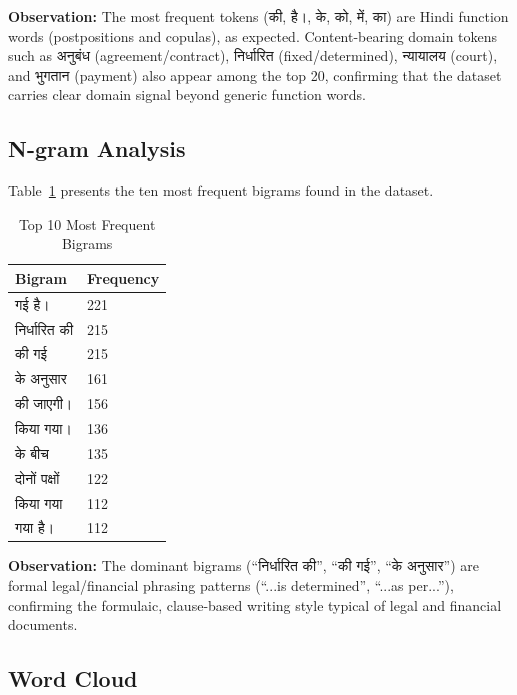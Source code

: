 \textbf{Observation:} The most frequent tokens (की, है।, के, को, में, का) are Hindi function words (postpositions and copulas), as expected. Content-bearing domain tokens such as अनुबंध (agreement/contract), निर्धारित (fixed/determined), न्यायालय (court), and भुगतान (payment) also appear among the top 20, confirming that the dataset carries clear domain signal beyond generic function words.


\subsection{N-gram Analysis}

Table~\ref{tab:bigrams} presents the ten most frequent bigrams found in the dataset.

\begin{table}[H]
\centering
\caption{Top 10 Most Frequent Bigrams}
\label{tab:bigrams}
\begin{tabular}{|p{6cm}|p{3cm}|}
\hline
\textbf{Bigram} & \textbf{Frequency} \\
\hline
गई है। & 221 \\ \hline
निर्धारित की & 215 \\ \hline
की गई & 215 \\ \hline
के अनुसार & 161 \\ \hline
की जाएगी। & 156 \\ \hline
किया गया। & 136 \\ \hline
के बीच & 135 \\ \hline
दोनों पक्षों & 122 \\ \hline
किया गया & 112 \\ \hline
गया है। & 112 \\ \hline
\end{tabular}
\end{table}

\textbf{Observation:} The dominant bigrams (``निर्धारित की'', ``की गई'', ``के अनुसार'') are formal legal/financial phrasing patterns (``...is determined'', ``...as per...''), confirming the formulaic, clause-based writing style typical of legal and financial documents.


\subsection{Word Cloud}

